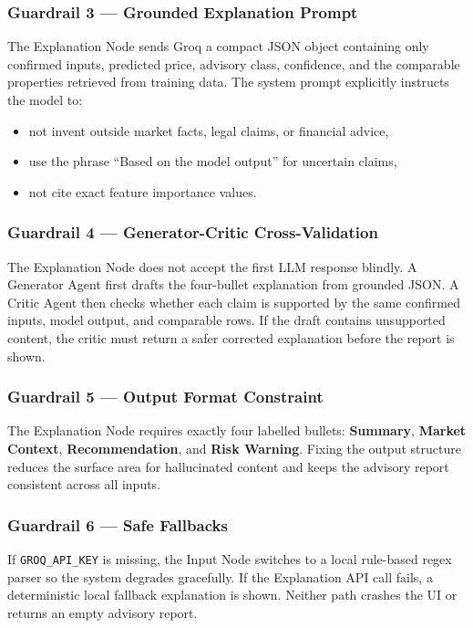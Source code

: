 \documentclass[12pt,a4paper]{article}
\begin{document}
\subsubsection{Guardrail 3 --- Grounded Explanation Prompt}
The Explanation Node sends Groq a compact JSON object containing only confirmed inputs, predicted price, advisory class, confidence, and the comparable properties retrieved from training data. The system prompt explicitly instructs the model to:
\begin{itemize}[leftmargin=1.5em, noitemsep]
  \item not invent outside market facts, legal claims, or financial advice,
  \item use the phrase ``Based on the model output'' for uncertain claims,
  \item not cite exact feature importance values.
\end{itemize}

\subsubsection{Guardrail 4 --- Generator-Critic Cross-Validation}
The Explanation Node does not accept the first LLM response blindly. A Generator Agent first drafts the four-bullet explanation from grounded JSON. A Critic Agent then checks whether each claim is supported by the same confirmed inputs, model output, and comparable rows. If the draft contains unsupported content, the critic must return a safer corrected explanation before the report is shown.

\subsubsection{Guardrail 5 --- Output Format Constraint}
The Explanation Node requires exactly four labelled bullets: \textbf{Summary}, \textbf{Market Context}, \textbf{Recommendation}, and \textbf{Risk Warning}. Fixing the output structure reduces the surface area for hallucinated content and keeps the advisory report consistent across all inputs.

\subsubsection{Guardrail 6 --- Safe Fallbacks}
If \texttt{GROQ\_API\_KEY} is missing, the Input Node switches to a local rule-based regex parser so the system degrades gracefully. If the Explanation API call fails, a deterministic local fallback explanation is shown. Neither path crashes the UI or returns an empty advisory report.
\end{document}
